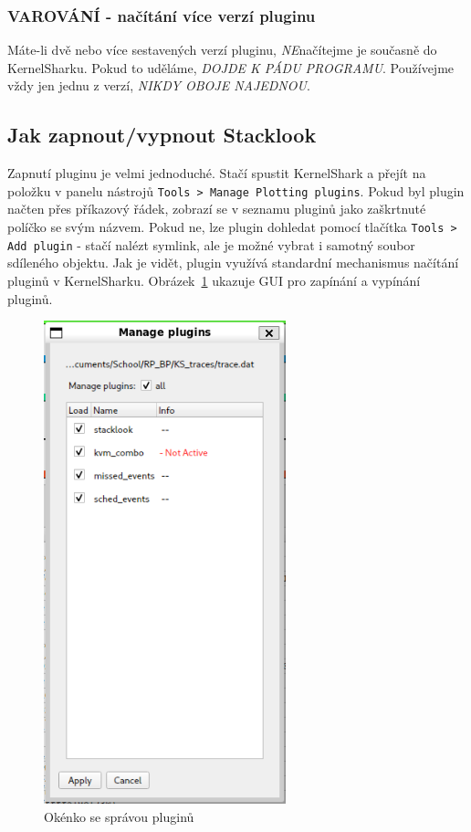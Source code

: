 \subsubsection{VAROVÁNÍ - načítání více verzí pluginu}

Máte-li dvě nebo více sestavených verzí pluginu, \emph{NE}načítejme je současně do KernelSharku. Pokud to uděláme, \emph{DOJDE K PÁDU PROGRAMU}. Používejme vždy jen jednu z verzí, \emph{NIKDY OBOJE NAJEDNOU}.

\subsection{Jak zapnout/vypnout Stacklook}

Zapnutí pluginu je velmi jednoduché. Stačí spustit KernelShark a přejít na položku v panelu nástrojů \texttt{Tools > Manage Plotting plugins}. Pokud byl plugin načten přes příkazový řádek, zobrazí se v seznamu pluginů jako zaškrtnuté políčko se svým názvem. Pokud ne, lze plugin dohledat pomocí tlačítka \texttt{Tools > Add plugin} - stačí nalézt symlink, ale je možné vybrat i samotný soubor sdíleného objektu. Jak je vidět, plugin využívá standardní mechanismus načítání pluginů v KernelSharku. Obrázek~\ref{SlManagePlottingPlugins} ukazuje GUI pro zapínání a vypínání pluginů.

\begin{figure}[p]\centering
    \includegraphics[height=140mm]{img/Stacklook/SlManagePlottingPlugins}
    \caption{Okénko se správou pluginů}
    \label{SlManagePlottingPlugins}
\end{figure}

